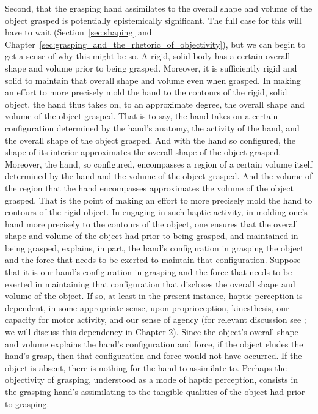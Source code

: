 Second, that the grasping hand assimilates to the overall shape and volume of the object grasped is potentially epistemically significant. The full case for this will have to wait (Section~\ref{sec:shaping} and Chapter~\ref{sec:grasping_and_the_rhetoric_of_objectivity}), but we can begin to get a sense of why this might be so. A rigid, solid body has a certain overall shape and volume prior to being grasped. Moreover, it is sufficiently rigid and solid to maintain that overall shape and volume even when grasped. In making an effort to more precisely mold the hand to the contours of the rigid, solid object, the hand thus takes on, to an approximate degree, the overall shape and volume of the object grasped. That is to say, the hand takes on a certain configuration determined by the hand's anatomy, the activity of the hand, and the overall shape of the object grasped. And with the hand so configured, the shape of its interior approximates the overall shape of the object grasped. Moreover, the hand, so configured, encompasses a region of a certain volume itself determined by the hand and the volume of the object grasped. And the volume of the region that the hand encompasses approximates the volume of the object grasped. That is the point of making an effort to more precisely mold the hand to contours of the rigid object. In engaging in such haptic activity, in molding one's hand more precisely to the contours of the object, one ensures that the overall shape and volume of the object had prior to being grasped, and maintained in being grasped, explains, in part, the hand's configuration in grasping the object and the force that needs to be exerted to maintain that configuration. Suppose that it is our hand's configuration in grasping and the force that needs to be exerted in maintaining that configuration that discloses the overall shape and volume of the object. If so, at least in the present instance, haptic perception is dependent, in some appropriate sense, upon proprioception, kinesthesis, our capacity for motor activity, and our sense of agency (for relevant discussion see \citealt{OShaughnessy:1989zp,OShaughnessy:1995ty,Martin:1992aa,Fulkerson:2014ek}; we will discuss this dependency in Chapter 2). Since the object's overall shape and volume explains the hand's configuration and force, if the object eludes the hand's grasp, then that configuration and force would not have occurred. If the object is absent, there is nothing for the hand to assimilate to. Perhaps the objectivity of grasping, understood as a mode of haptic perception, consists in the grasping hand's assimilating to the tangible qualities of the object had prior to grasping.


